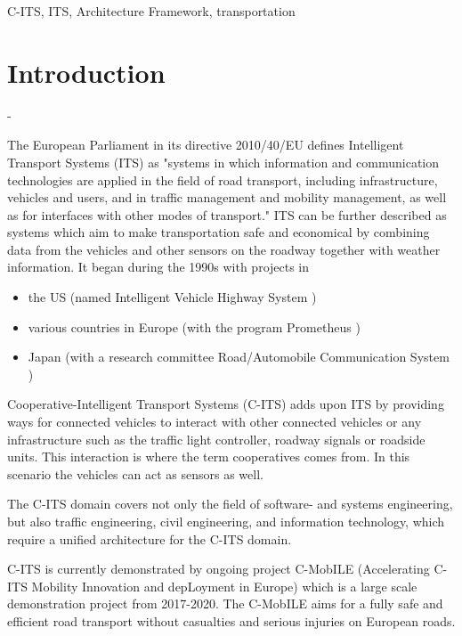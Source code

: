 \documentclass[conference]{IEEEtran}
\begin{document}
\begin{IEEEkeywords}
C-ITS, ITS, Architecture Framework, transportation
\end{IEEEkeywords}


\section{Introduction} -

The European Parliament in its directive 2010/40/EU \cite{ec} defines Intelligent Transport Systems (ITS) as "systems in which information and communication technologies are applied in the field of road transport, including infrastructure, vehicles and users, and in traffic management and mobility management, as well as for interfaces with other modes of transport."
ITS can be further described as systems which aim to make transportation safe and economical by combining data from the vehicles and other sensors on the roadway together with weather information. It began during the 1990s\cite{itsbegin} with projects in
\begin{itemize}
	\item the US (named Intelligent Vehicle Highway System \cite{ivhs})
	\item various countries in Europe (with the program Prometheus \cite{prometheus})
	\item Japan (with a research committee Road/Automobile Communication System \cite{racs})
\end{itemize}

Cooperative-Intelligent Transport Systems (C-ITS) \cite{c-its} adds upon ITS by providing ways for connected vehicles to interact with other connected vehicles or any infrastructure such as the traffic light controller, roadway signals or roadside units. This interaction is where the term cooperatives comes from. In this scenario the vehicles can act as sensors as well.

The C-ITS domain covers not only the field of software- and systems engineering, but also traffic engineering, civil engineering, and information technology, which require a unified architecture for the C-ITS domain.

C-ITS is currently demonstrated by ongoing project C-MobILE (Accelerating C-ITS Mobility Innovation and depLoyment in Europe) which is a large scale demonstration project from 2017-2020. The C-MobILE aims for a fully safe and efficient road transport without casualties and serious injuries on European roads.
 
\end{document}
